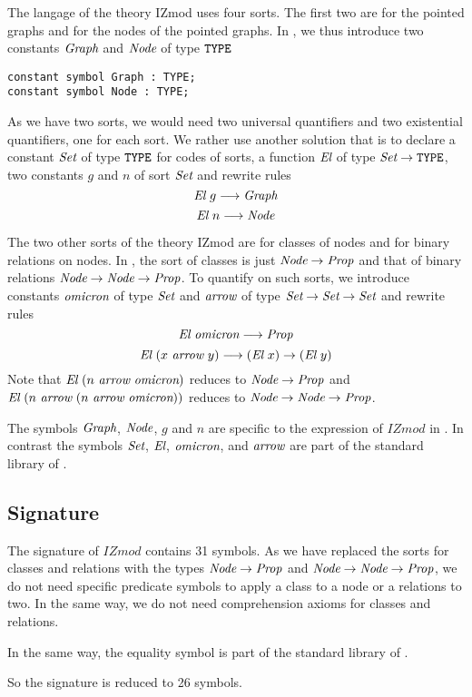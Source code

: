 \documentclass[a4paper]{article}
\begin{document}
The langage of the theory IZmod uses four sorts. The first two are for
the pointed graphs and for the nodes of the pointed graphs.  In
\dedukti, we thus introduce two constants ${\mbox{\it Graph}}$ and ${\mbox{\it Node}}$ of type
$\mbox{\tt TYPE}$
\begin{lstlisting}
constant symbol Graph : TYPE;
constant symbol Node : TYPE;
\end{lstlisting}
As we have two sorts, we would need two universal quantifiers and two
existential quantifiers, one for each sort.  We rather use another
solution \cite{theoryU} that is to declare a constant $\mbox{\it Set}$ of type
$\mbox{\tt TYPE}$ for codes of sorts, a function ${\mbox{\it El}}$ of type $\mbox{\it Set} \rightarrow \mbox{\tt TYPE}$,
two constants $g$ and $n$ of sort $\mbox{\it Set}$ and rewrite rules
$${\mbox{\it El}}~g \longrightarrow {\mbox{\it Graph}}$$
$${\mbox{\it El}}~n \longrightarrow {\mbox{\it Node}}$$

The two other sorts of the theory IZmod are for classes of nodes and
for binary relations on nodes.  In \dedukti, the sort of classes is
just ${\mbox{\it Node}} \rightarrow {\mbox{\it Prop}}$ and that of binary relations
${\mbox{\it Node}} \rightarrow {\mbox{\it Node}} \rightarrow {\mbox{\it Prop}}$. To quantify on such sorts, we introduce
constants ${\mbox{\it omicron}}$ of type $\mbox{\it Set}$ and ${\mbox{\it arrow}} $ of type
$\mbox{\it Set} \rightarrow \mbox{\it Set} \rightarrow \mbox{\it Set}$ and rewrite rules
$${\mbox{\it El}}~{\mbox{\it omicron}} \longrightarrow {\mbox{\it Prop}}$$
$${\mbox{\it El}}~(x~{\mbox{\it arrow}}~y) \longrightarrow ({\mbox{\it El}}~x) \rightarrow ({\mbox{\it El}}~y)$$
Note that ${\mbox{\it El}}~(n~{\mbox{\it arrow}}~{\mbox{\it omicron}})$ reduces to ${\mbox{\it Node}} \rightarrow {\mbox{\it Prop}}$ and 
${\mbox{\it El}}~(n~{\mbox{\it arrow}}~(n~{\mbox{\it arrow}}~{\mbox{\it omicron}}))$ reduces to ${\mbox{\it Node}} \rightarrow {\mbox{\it Node}} \rightarrow {\mbox{\it Prop}}$. 

The symbols ${\mbox{\it Graph}}$, ${\mbox{\it Node}}$, $g$ and $n$ are specific to the
expression of $IZmod$ in \dedukti. In contrast the symbols $\mbox{\it Set}$,
${\mbox{\it El}}$, ${\mbox{\it omicron}}$, and ${\mbox{\it arrow}}$ are part of the standard library of 
\dedukti.

\subsection{Signature}

The signature of $IZmod$ contains 31 symbols. As we have replaced the
sorts for classes and relations with the \dedukti types
${\mbox{\it Node}} \rightarrow {\mbox{\it Prop}}$ and ${\mbox{\it Node}} \rightarrow {\mbox{\it Node}} \rightarrow {\mbox{\it Prop}}$, we do not need
specific predicate symbols to apply a class to a node or a relations
to two. In the same way, we do not need comprehension axioms for 
classes and relations. 

In the same way, the equality symbol is part of the standard library of 
\dedukti.

So the signature is reduced to 26 symbols. 
\end{document}
